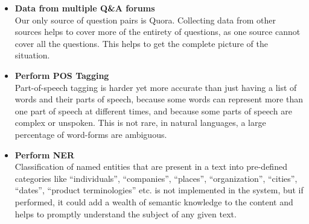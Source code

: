 \begin{itemize}
	\item \textbf{Data from multiple Q\&A forums} \\
	Our only source of question pairs is Quora. Collecting data from other sources helps to cover more of the entirety of questions, as one source cannot cover all the questions. This helps to get the complete picture of the situation.
	
	\item \textbf{Perform \acl{POS} Tagging} \\
	Part-of-speech tagging is harder yet more accurate than just having a list of words and their parts of speech, because some words can represent more than one part of speech at different times, and because some parts of speech are complex or unspoken. This is not rare, in natural languages, a large percentage of word-forms are ambiguous.
	
	\item {\textbf{Perform \acl{NER}}} \\
	Classification of named entities that are present in a text into pre-defined categories like “individuals”, “companies”, “places”, “organization”, “cities”, “dates”, “product terminologies” etc. is not implemented in the system, but if performed, it could add a wealth of semantic knowledge to the content and helps to promptly understand the subject of any given text.
\end{itemize}

\renewcommand\bibname{References} %



